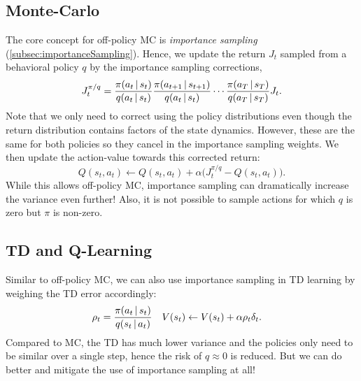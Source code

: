 		\subsection{Monte-Carlo}
			The core concept for off-policy \ac{MC} is \emph{importance sampling} (\autoref{subsec:importanceSampling}). Hence, we update the return \(J_t\) sampled from a behavioral policy \(q\) by the importance sampling corrections,
			\begin{equation}
				J_t^{\pi/q} = \frac{\pi(a_t \,\vert\, s_t)}{q(a_t \,\vert\, s_t)} \frac{\pi(a_{t + 1} \,\vert\, s_{t + 1})}{q(a_t \,\vert\, s_t)} \cdots \frac{\pi(a_T \,\vert\, s_T)}{q(a_T \,\vert\, s_T)} J_t.
			\end{equation}
			Note that we only need to correct using the policy distributions even though the return distribution contains factors of the state dynamics. However, these are the same for both policies so they cancel in the importance sampling weights. We then update the action-value towards this corrected return:
			\begin{equation}
				Q(s_t, a_t) \gets Q(s_t, a_t) + \alpha \bigl( J_t^{\pi/q} - Q(s_t, a_t) \bigr).
			\end{equation}
			While this allows off-policy \ac{MC}, importance sampling can dramatically increase the variance even further! Also, it is not possible to sample actions for which \(q\) is zero but \(\pi\) is non-zero.

		\subsection{\acs{TD} and Q-Learning}
			Similar to off-policy \ac{MC}, we can also use importance sampling in \ac{TD} learning by weighing the \ac{TD} error accordingly:
			\begin{align}
				\rho_t & = \frac{\pi(a_t \,\vert\, s_t)}{q(s_t \,\vert\, a_t)} &
				V(s_t) & \gets V(s_t) + \alpha \rho_t \delta_t.
			\end{align}
			Compared to \ac{MC}, the \ac{TD} has much lower variance and the policies only need to be similar over a single step, hence the risk of \(q \approx 0\) is reduced. But we can do better and mitigate the use of importance sampling at all!

